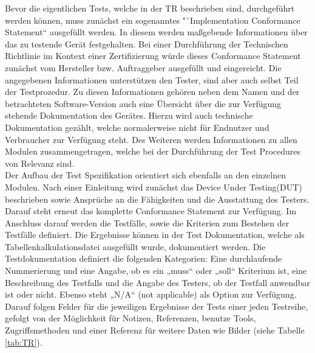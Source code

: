 \documentclass[a4paper]{book}
\begin{document}
\begin{large}
\begin{onehalfspace}
Bevor die eigentlichen Tests, welche in der TR beschrieben sind, durchgeführt werden können, muss zunächst ein sogenanntes "`Implementation Conformance Statement“ ausgefüllt werden. In diesem werden maßgebende Informationen über das zu testende Gerät festgehalten. Bei einer Durchführung der Technischen Richtlinie im Kontext einer Zertifizierung würde dieses \glqq Conformance Statement\grqq{} zunächst vom Hersteller bzw. Auftraggeber ausgefüllt und eingereicht. Die angegebenen Informationen unterstützen den Tester, sind aber auch selbst Teil der Testprozedur. Zu diesen Informationen gehören neben dem Namen und der betrachteten Software-Version auch eine Übersicht über die zur Verfügung stehende Dokumentation des Gerätes. Hierzu wird auch technische Dokumentation gezählt, welche normalerweise nicht für Endnutzer und Verbraucher zur Verfügung steht. Des Weiteren werden Informationen zu allen Modulen zusammengetragen, welche bei der Durchführung der \glqq Test Procedures\grqq{} von Relevanz sind. \\ \indent
Der Aufbau der Test Spezifikation orientiert sich ebenfalls an den einzelnen Modulen. Nach einer Einleitung wird zunächst das \glqq Device Under Testing\grqq{}(DUT) beschrieben sowie Ansprüche an die Fähigkeiten und die Ausstattung des Testers. Darauf steht erneut das komplette \glqq Conformance Statement\grqq{} zur Verfügung. Im Anschluss darauf werden die Testfälle, sowie die Kriterien zum Bestehen der Testfälle definiert. Die Ergebnisse können in der Test Dokumentation, welche als Tabellenkalkulationsdatei ausgefüllt wurde, dokumentiert werden. Die Testdokumentation definiert die folgenden Kategorien: Eine durchlaufende Nummerierung und eine Angabe, ob es ein „muss“ oder „soll“ Kriterium ist, eine Beschreibung des Testfalls und die Angabe des Testers, ob der Testfall anwendbar ist oder nicht. Ebenso steht „N/A“ (not applicable) als Option zur Verfügung. Darauf folgen Felder für die jeweiligen Ergebnisse der Tests einer jeden Testreihe, gefolgt von der Möglichkeit für Notizen, Referenzen, benutze Tools, Zugriffsmethoden und einer Referenz für weitere Daten wie Bilder (siehe Tabelle \ref{tab:TR}).



\end{onehalfspace}
\end{large}
\end{document}
